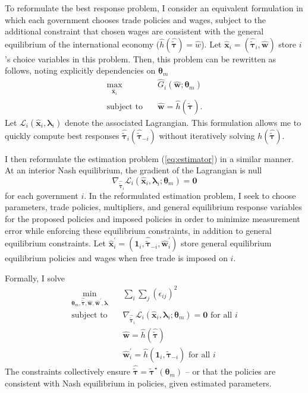 \documentclass{puthesis}
\begin{document}
To reformulate the best response problem, I consider an equivalent
formulation in which each government chooses trade policies and wages,
subject to the additional constraint that chosen wages are consistent
with the general equilibrium of the international economy
(\(\hat{h}(\hat{\tilde{\bm{\tau}}}) = \hat{w}\)). Let
\(\hat{\bm{x}}_i = \left( \hat{\tilde{\bm{\tau}}}_i, \hat{\bm{w}} \right)\)
store \(i\)'s choice variables in this problem. Then, this problem can
be rewritten as follows, noting explicitly dependencies on
\(\bm{\theta}_m\) \begin{equation} \label{eq:tauTildeHatMPEC}
\begin{split}
\max_{\hat{\bm{x}}_i} & \quad \hat{G}_i(\hat{\bm{w}}; \bm{\theta}_m) \\
\text{subject to} & \quad \hat{\bm{w}} = \hat{h}(\hat{\tilde{\bm{\tau}}}) .
\end{split}
\end{equation} Let \(\mathcal{L}_i(\hat{\bm{x}}_i, \bm{\lambda}_i)\)
denote the associated Lagrangian. This formulation allows me to quickly
compute best responses
\(\hat{\tilde{\bm{\tau}}}_i(\hat{\tilde{\bm{\tau}}}_{-i})\) without
iteratively solving \(h(\hat{\tilde{\bm{\tau}}})\).

I then reformulate the estimation problem (\ref{eq:estimator}) in a
similar manner. At an interior Nash equilibrium, the gradient of the
Lagrangian is null \[
\nabla_{\hat{\tilde{\bm{\tau}}}_i} \mathcal{L}_i(\hat{\bm{x}}_i, \bm{\lambda}_i; \bm{\theta}_m) = \bm{0}
\] for each government \(i\). In the reformulated estimation problem, I
seek to choose parameters, trade policies, multipliers, and general
equilibrium response variables for the proposed policies and imposed
policies in order to minimize measurement error while enforcing these
equilibrium constraints, in addition to general equilibrium constraints.
Let
\(\hat{\bm{x}}_i^\prime = \left( \bm{1}_i, \hat{\tilde{\bm{\tau}}}_{-i}, \hat{\bm{w}}_i^\prime \right)\)
store general equilibrium equilibrium policies and wages when free trade
is imposed on \(i\).

Formally, I solve \begin{equation} \label{eq:estimatorMPEC}
\begin{split}
\min_{ \bm{\theta}_m, \hat{\tilde{\bm{\tau}}}, \hat{\bm{w}}, \hat{\bm{w}}^\prime, \bm{\lambda} } & \quad \sum_i \sum_j \left( \epsilon_{ij} \right)^2 \\
\text{subject to} & \quad \nabla_{\hat{\tilde{\bm{\tau}}}_i} \mathcal{L}_i(\hat{\bm{x}}_i, \bm{\lambda}_i; \bm{\theta}_m) = \bm{0} \text{ for all } i \\
& \quad \hat{\bm{w}} = \hat{h} \left( \hat{\tilde{\bm{\tau}}} \right) \\
& \quad \hat{\bm{w}}_i^\prime = \hat{h} \left( \bm{1}_i, \hat{\tilde{\bm{\tau}}}_{-i} \right) \text{ for all } i
\end{split}
\end{equation} The constraints collectively ensure
\(\hat{\tilde{\bm{\tau}}} = \tilde{\bm{\tau}}^\star(\bm{\theta}_m)\) --
or that the policies are consistent with Nash equilibrium in policies,
given estimated parameters.
\end{document}
